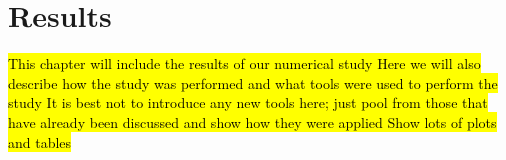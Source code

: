 \chapter{Results}
\label{ch:results}
\hl{This chapter will include the results of our numerical study
Here we will also describe how the study was performed and what tools were used to perform the study
It is best not to introduce any new tools here; just pool from those that have already been discussed and show how they were applied
Show lots of plots and tables}